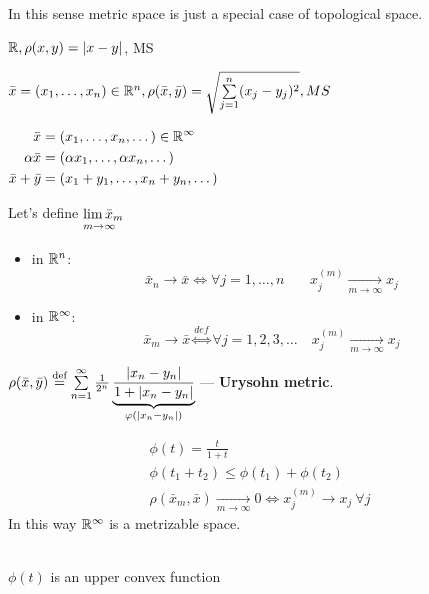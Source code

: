 In this sense metric space is just a special case of topological space.
\begin{ex}
  $\mathbb{R}, \rho(x, y) = |x - y|$, MS
\end{ex}
\begin{ex}
  $\bar{x} = (x_1, \dotsc, x_n) \in \mathbb{R}^n, \rho(\bar{x}, \bar{y}) = \sqrt{\sum\limits_{j = 1}^n(x_j - y_j)^2}, MS$
\end{ex}
\begin{ex}
    \hspace{-1.9em}$\begin{aligned}[t]
      \bar{x} &= (x_1, \dotsc, x_n, \dotso) \in \mathbb{R}^\infty \\
      \alpha\bar{x} &= (\alpha x_1, \dotsc, \alpha x_n, \dotsc) \\
      \bar{x} + \bar{y} &= (x_1 + y_1, \dotsc, x_n + y_n, \dotsc)
  \end{aligned}$

      Let's define $\alim{\bar{x}_m}{m \to \infty}$
      \begin{itemize}
          \item{in $\mathbb{R}^n$:}
              \[\bar{x}_n \to \bar{x} \iff \forall j = 1, \dotsc, n\quad\ \ \:\,x_j^{(m)} \xrightarrow[m \to \infty]{} x_j\]
          \item{in $\mathbb{R}^\infty$:}
              \[\bar{x}_m \to \bar{x} \overset{def}{\iff} \forall j = 1,2,3,\dotso \quad x_j^{(m)} \xrightarrow[m \to \infty]{} x_j\]
      \end{itemize}
\end{ex}
\begin{defn}
  $\rho(\bar{x}, \bar{y}) \overset{\text{def}}{=} \sum\limits_{n = 1}^\infty \frac{1}{2^n}\underbrace{\frac{|x_n - y_n|}{1 + |x_n - y_n|}}_{\varphi(|x_n - y_n|)}$
  --- \textbf{Urysohn metric}.

  \vspace{-1em}
  \begin{minipage}{.5\linewidth}
  \begin{gather*}
      \phi(t) = \frac{t}{1 + t} \\
      \phi(t_1 + t_2) \leq \phi(t_1) + \phi(t_2) \\
      \rho(\bar{x}_m, \bar{x}) \xrightarrow[m \to \infty]{} 0 \iff x_j^{(m)} \to x_j\ \forall j
  \end{gather*}
  In this way $\mathbb{R}^\infty$ is a metrizable space.
  \end{minipage}
  \begin{minipage}{.4\linewidth}
  \\\centering $\phi(t)$ is an upper convex function
  \end{minipage}
\end{defn}
